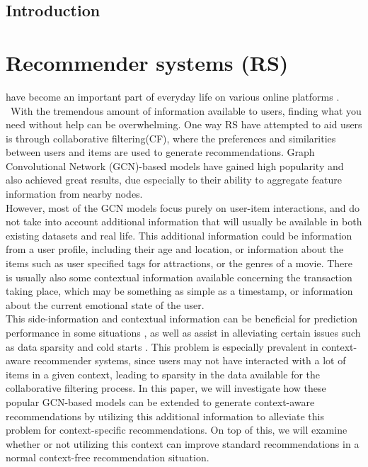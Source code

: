 \noindent
\section{Introduction}
\chapter{Recommender systems (RS)}\label{ch:introduction}
have become an important part of everyday life on various online platforms \cite{youtuberecommendation, industryperspective}.\\\
With the tremendous amount of information available to users, finding what you need without help can be overwhelming.
One way RS have attempted to aid users is through collaborative filtering(CF), where the preferences and similarities between users and items are used to generate recommendations. 
Graph Convolutional Network (GCN)-based models \cite{NGCF,LightGCN,KGAT} have gained high popularity and also achieved great results, due especially to their ability to aggregate feature information from nearby nodes.\\
However, most of the GCN models focus purely on user-item interactions, and do not take into account additional information that will usually be available in both existing datasets and real life.
This additional information could be information from a user profile, including their age and location, or information about the items such as user specified tags for attractions, or the genres of a movie.
There is usually also some contextual information available concerning the transaction taking place, which may be something as simple as a timestamp, or information about the current emotional state of the user.\\
This side-information and contextual information can be beneficial for prediction performance in some situations \cite{ContextImportance, ContextImportance2, ContextImportance3}, as well as assist in alleviating certain issues such as data sparsity and cold starts \cite{SIdeInforImportance}.
This problem is especially prevalent in context-aware recommender systems, since users may not have interacted with a lot of items in a given context, leading to sparsity in the data available for the collaborative filtering process.
In this paper, we will investigate how these popular GCN-based models can be extended to generate context-aware recommendations by utilizing this additional information to alleviate this problem for context-specific recommendations.
On top of this, we will examine whether or not utilizing this context can improve standard recommendations in a normal context-free recommendation situation.
